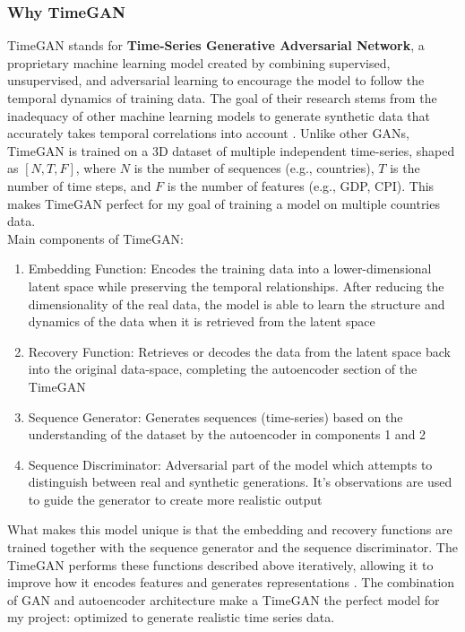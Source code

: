 \documentclass[10pt,twocolumn]{article}
\begin{document}
\subsubsection{Why TimeGAN}
TimeGAN stands for \textbf{Time-Series Generative Adversarial Network}, a proprietary machine learning model created by \textcite{yoon2019timeseriesgenerative} combining supervised, unsupervised, and adversarial learning to encourage the model to follow the temporal dynamics of training data. The goal of their research stems from the inadequacy of other machine learning models to generate synthetic data that accurately takes temporal correlations into account \cite{yoon2019timeseriesgenerative}. 
Unlike other GANs, TimeGAN is trained on a 3D dataset of multiple independent time-series, shaped as $[N, T, F]$, where $N$ is the number of sequences (e.g., countries), $T$ is the number of time steps, and $F$ is the number of features (e.g., GDP, CPI). This makes TimeGAN perfect for my goal of training a model on multiple countries data.\\
Main components of TimeGAN:
\begin{enumerate}
    \item Embedding Function: Encodes the training data into a lower-dimensional latent space while preserving the temporal relationships. After reducing the dimensionality of the real data, the model is able to learn the structure and dynamics of the data when it is retrieved from the latent space 
    \item Recovery Function: Retrieves or decodes the data from the latent space back into the original data-space, completing the autoencoder section of the TimeGAN
    \item Sequence Generator: Generates sequences (time-series) based on the understanding of the dataset by the autoencoder in components 1 and 2
    \item Sequence Discriminator: Adversarial part of the model which attempts to distinguish between real and synthetic generations. It’s observations are used to guide the generator to create more realistic output
\end{enumerate}

What makes this model unique is that the embedding and recovery functions are trained together with the sequence generator and the sequence discriminator. The TimeGAN performs these functions described above iteratively, allowing it to improve how it encodes features and generates representations \cite{yoon2019timeseriesgenerative}. The combination of GAN and autoencoder architecture make a TimeGAN the perfect model for my project: optimized to generate realistic time series data.
\end{document}
